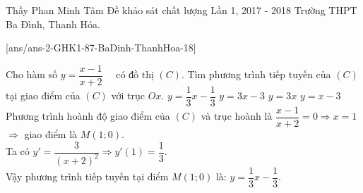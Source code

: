 	\begin{name}
		{Thầy Phan Minh Tâm}
		{Đề khảo sát chất lượng Lần 1, 2017 - 2018 Trường THPT Ba Đình, Thanh Hóa. }
	\end{name}
	\setcounter{ex}{0}
	[ans/ans-2-GHK1-87-BaDinh-ThanhHoa-18]
\begin{ex}%
Cho hàm số $ y = \dfrac{x-1}{x+2} \quad \text{ có đồ thị }(C). $ Tìm phương trình tiếp tuyến của $ (C) $ tại giao điểm của $ (C) $ với trục $ Ox $.
\choice
{\True $ y = \dfrac{1}{3}x - \dfrac{1}{3} $}
{$ y = 3x - 3 $}
{$ y = 3x$}
{$ y = x - 3$}
\loigiai
{
Phương trình hoành độ giao điểm của $ (C) $ và trục hoành là $ \dfrac{x-1}{x+2} = 0 \Rightarrow x = 1$\\
$ \Rightarrow  $ giao điểm là $ M(1;0). $\\
Ta có $ y' = \dfrac{3}{(x+2)^2} \Rightarrow y'(1) = \dfrac{1}{3} $.\\
Vậy phương trình tiếp tuyến tại điểm $ M(1;0) $ là: $ y  = \dfrac{1}{3}x - \dfrac{1}{3}. $
}
\end{ex}

